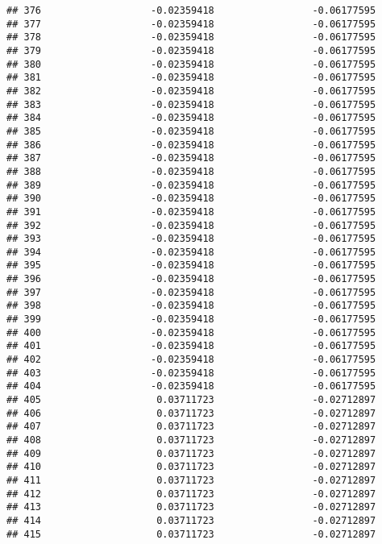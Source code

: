 \documentclass[]{article}
\begin{document}
\begin{verbatim}
## 376                   -0.02359418                 -0.06177595
## 377                   -0.02359418                 -0.06177595
## 378                   -0.02359418                 -0.06177595
## 379                   -0.02359418                 -0.06177595
## 380                   -0.02359418                 -0.06177595
## 381                   -0.02359418                 -0.06177595
## 382                   -0.02359418                 -0.06177595
## 383                   -0.02359418                 -0.06177595
## 384                   -0.02359418                 -0.06177595
## 385                   -0.02359418                 -0.06177595
## 386                   -0.02359418                 -0.06177595
## 387                   -0.02359418                 -0.06177595
## 388                   -0.02359418                 -0.06177595
## 389                   -0.02359418                 -0.06177595
## 390                   -0.02359418                 -0.06177595
## 391                   -0.02359418                 -0.06177595
## 392                   -0.02359418                 -0.06177595
## 393                   -0.02359418                 -0.06177595
## 394                   -0.02359418                 -0.06177595
## 395                   -0.02359418                 -0.06177595
## 396                   -0.02359418                 -0.06177595
## 397                   -0.02359418                 -0.06177595
## 398                   -0.02359418                 -0.06177595
## 399                   -0.02359418                 -0.06177595
## 400                   -0.02359418                 -0.06177595
## 401                   -0.02359418                 -0.06177595
## 402                   -0.02359418                 -0.06177595
## 403                   -0.02359418                 -0.06177595
## 404                   -0.02359418                 -0.06177595
## 405                    0.03711723                 -0.02712897
## 406                    0.03711723                 -0.02712897
## 407                    0.03711723                 -0.02712897
## 408                    0.03711723                 -0.02712897
## 409                    0.03711723                 -0.02712897
## 410                    0.03711723                 -0.02712897
## 411                    0.03711723                 -0.02712897
## 412                    0.03711723                 -0.02712897
## 413                    0.03711723                 -0.02712897
## 414                    0.03711723                 -0.02712897
## 415                    0.03711723                 -0.02712897

\end{verbatim}
\end{document}
